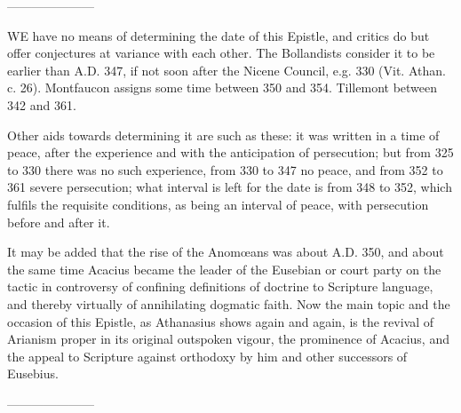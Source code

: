 ———————


WE
have no means of determining the date of this Epistle, and critics do
but offer conjectures at variance with each other. The Bollandists
consider it to be earlier than A.D.
347, if not soon after the Nicene Council, e.g. 330 (Vit. Athan. c.
26). Montfaucon assigns some time between 350 and 354. Tillemont
between 342 and 361.

Other aids towards determining
it are such as these: it was written in a time of peace, after the
experience and with the anticipation of persecution; but from 325 to
330 there was no such experience, from 330 to 347 no peace, and from
352 to 361 severe persecution; what interval is left for the date is
from 348 to 352, which fulfils the requisite conditions, as being an
interval of peace, with persecution before and after it.

It may be added that the rise
of the Anomœans was about A.D. 350, and about the same time Acacius
became the leader of the Eusebian or court party on the tactic in
controversy of confining definitions of doctrine to Scripture
language, and thereby virtually of annihilating dogmatic faith. Now
the main topic and the occasion of this Epistle, as Athanasius shows
again and again, is the revival of Arianism proper in its
original outspoken vigour, the prominence of Acacius, and the appeal
to Scripture against orthodoxy by him and other successors of
Eusebius.

———————



